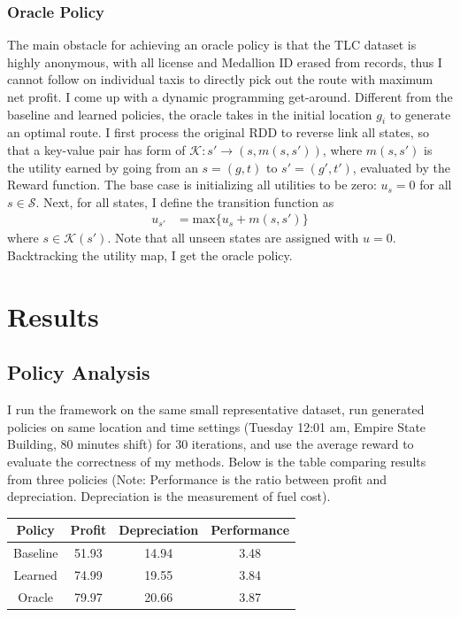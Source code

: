 \documentclass[letterpaper, 10 pt, conference]{ieeeconf}
\begin{document}
\subsubsection{Oracle Policy}
The main obstacle for achieving an oracle policy is that the TLC dataset is highly anonymous, with all license and Medallion ID erased from records, thus I cannot follow on individual taxis to directly pick out the route with maximum net profit. I come up with a dynamic programming get-around. Different from the baseline and learned policies, the oracle takes in the initial location $g_i$ to generate an optimal route. I first process the original RDD to reverse link all states, so that a key-value pair has form of $\mathcal{K}: s'\to(s,m(s,s'))$, where $m(s,s')$ is the utility earned by going from an $s=(g,t)$ to $s'=(g',t')$, evaluated by the Reward function. The base case is initializing all utilities to be zero: $u_s=0$ for all $s\in\mathcal{S}$. Next, for all states, I define the transition function as
\begin{align}
u_{s'} &= \text{max}\{u_{s}+m(s, s')\}
\end{align}
where $s\in\mathcal{K}(s')$. Note that all unseen states are assigned with $u=0$. Backtracking the utility map, I get the oracle policy.
\section{Results}
\subsection{Policy Analysis}
I run the framework on the same small representative dataset, run generated policies on same location and time settings (Tuesday 12:01 am, Empire State Building, 80 minutes shift) for 30 iterations, and use the average reward to evaluate the correctness of my methods. Below is the table comparing results from three policies (Note: Performance is the ratio between profit and depreciation. Depreciation is the measurement of fuel cost).
\begin{center}
\begin{tabular}{|c||c|c|c|}
\hline
Policy & Profit & Depreciation & Performance \\ \hline
Baseline & 51.93 & 14.94 & 3.48 \\    \hline
Learned & 74.99 & 19.55 & 3.84 \\    \hline
Oracle & 79.97 & 20.66 & 3.87 \\    \hline
\end{tabular}
\end{center}
\end{document}
